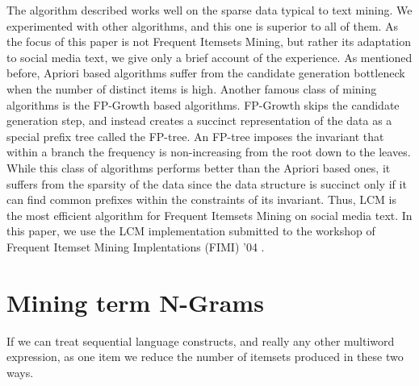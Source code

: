 \documentclass{sig-alternate}
\begin{document}
The algorithm described works well on the sparse data typical to text mining. We experimented with other algorithms, and this one is superior to all of them. As the focus of this paper is not Frequent Itemsets Mining, but rather its adaptation to social media text, we give only a brief account of the experience. As mentioned before, Apriori based algorithms suffer from the candidate generation bottleneck when the number of distinct items is high. Another famous class of mining algorithms is the FP-Growth \cite{han} based algorithms. FP-Growth  skips the candidate generation step, and instead creates a succinct representation of the data as a special prefix tree called the FP-tree. An FP-tree imposes the invariant that within a branch the frequency is non-increasing from the root down to the leaves. While this class of algorithms performs better than the Apriori based ones, it suffers from the sparsity of the data since the data structure is succinct only if it can find common prefixes within the constraints of its invariant. Thus, LCM is the most efficient algorithm for Frequent Itemsets Mining on social media text. In this paper, we use the LCM implementation submitted to the workshop of Frequent Itemset Mining Implentations (FIMI) '04 \cite{fimi04}.

\section{Mining term N-Grams}
\label{sec:ngrams}
If we can treat sequential language constructs, and really any other multiword expression, as one item we reduce the number of itemsets produced in these two ways. %
\end{document}
